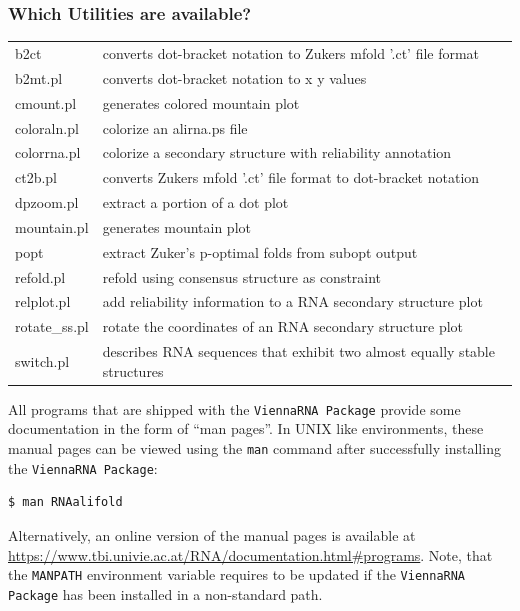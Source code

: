 \documentclass[a4paper]{article}
\newcommand{\frametitle}[1]{\subsubsection{#1}}
\begin{document}

  \frametitle{Which Utilities are available?}
	
  {\small
  \begin{tabular}{ll}
	b2ct	& converts dot-bracket notation to Zukers mfold '.ct' file format \\
	b2mt.pl	& converts dot-bracket notation to x y values \\
	cmount.pl	& generates colored mountain plot\\
	coloraln.pl	& colorize an alirna.ps file\\
	colorrna.pl	& colorize a secondary structure with reliability annotation\\
	ct2b.pl	& converts Zukers mfold '.ct' file format to dot-bracket notation\\
	dpzoom.pl	& extract a portion of a dot plot \\
	mountain.pl	& generates mountain plot \\
	popt	& extract Zuker's p-optimal folds from subopt output\\
	refold.pl	& refold using consensus structure as constraint\\
	relplot.pl	& add reliability information to a RNA secondary structure plot\\
	rotate\_ss.pl	& rotate the coordinates of an RNA secondary structure plot\\
	switch.pl	& describes RNA sequences that exhibit two almost equally stable structures\\
  \end{tabular}}
\noindent

\vspace*{2ex}\noindent
All programs that are shipped with the \texttt{ViennaRNA Package} provide
some documentation in the form of ``man pages''. In UNIX like environments, these
manual pages can be viewed using the \texttt{man} command after successfully
installing the \texttt{ViennaRNA Package}:
\begin{verbatim}
$ man RNAalifold
\end{verbatim}%
Alternatively, an online version of the manual pages is available at\\
\url{https://www.tbi.univie.ac.at/RNA/documentation.html#programs}.
Note, that the \texttt{MANPATH} environment variable requires to be updated
if the \texttt{ViennaRNA Package} has been installed in a non-standard path.
\end{document}
